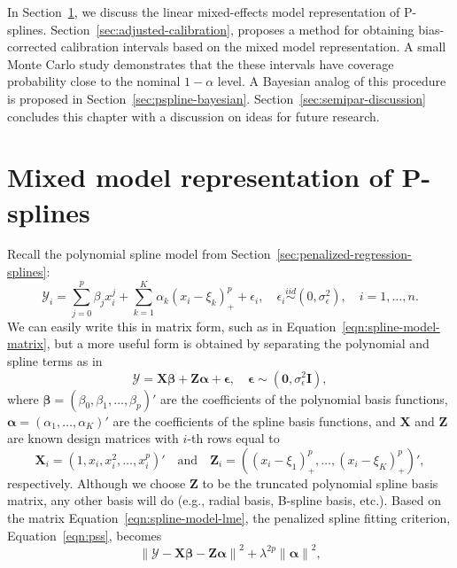 \documentclass[cmfont,usenames,dvipsnames,leqno]{afit-etd}\usepackage[]{graphicx}\usepackage[]{color}
\newcommand{\norm}[1]{\left\|#1\right\|}
\newcommand{\bc}[1]{\ensuremath{\bm{\mathcal{#1}}}}
\newcommand{\mc}[1]{\ensuremath{\mathcal{#1}}}
\begin{document}
In Section~\ref{sec:pspline-lmm}, we discuss the linear mixed-effects model representation of \ac{P-spline}s. Section~\ref{sec:adjusted-calibration}, proposes a method for obtaining bias-corrected calibration intervals based on the mixed model representation. A small Monte Carlo study demonstrates that the these intervals have coverage probability close to the nominal $1-\alpha$ level. A Bayesian analog of this procedure is proposed in Section~\ref{sec:pspline-bayesian}. Section~\ref{sec:semipar-discussion} concludes this chapter with a discussion on ideas for future research.

\section{Mixed model representation of P-splines}
\label{sec:pspline-lmm}
Recall the polynomial spline model from Section~\ref{sec:penalized-regression-splines}:
\begin{equation}
  \mc{Y}_i = \sum_{j = 0}^p\beta_jx_i^j + \sum_{k = 1}^K \alpha_k\left(x_i - \xi_k\right)_+^p + \epsilon_i, \quad \epsilon_i \stackrel{iid}{\sim} \left(0, \sigma_\epsilon^2\right), \quad i = 1, \dotsc, n.
\end{equation}
We can easily write this in matrix form, such as in Equation~\eqref{eqn:spline-model-matrix}, but a more useful form is obtained by separating the polynomial and spline terms as in
\begin{equation}
\label{eqn:spline-model-lme}
  \bc{Y} = \bm{X}\bm{\beta} + \bm{Z}\bm{\alpha} + \bm{\epsilon}, \quad \bm{\epsilon} \sim \left(\bm{0}, \sigma_\epsilon^2\bm{I}\right),
\end{equation}
where $\bm{\beta} = (\beta_0, \beta_1, \dotsc, \beta_p)'$ are the coefficients of the polynomial basis functions, $\bm{\alpha} = (\alpha_1, \dotsc, \alpha_K)'$ are the coefficients of the spline basis functions, and $\bm{X}$ and $\bm{Z}$ are known design matrices with $i$-th rows equal to
\begin{equation*}
\bm{X}_i = \left(1, x_i, x_i^2, \dotsc, x_i^p \right)' \quad \text{and} \quad  \bm{Z}_i = \left( (x_i - \xi_1)_+^p, \dotsc, (x_i - \xi_K)_+^p \right)',
\end{equation*}
respectively. Although we choose $\bm{Z}$ to be the truncated polynomial spline basis matrix, any other basis will do (e.g., radial basis, B-spline basis, etc.). Based on the matrix Equation~\eqref{eqn:spline-model-lme}, the penalized spline fitting criterion, Equation~\eqref{eqn:pss}, becomes
\begin{equation*}
  \norm{\bc{Y} - \bm{X}\bm{\beta} - \bm{Z}\bm{\alpha}}^2 + \lambda^{2p}\norm{\bm{\alpha}}^2,
\end{equation*}
\end{document}
